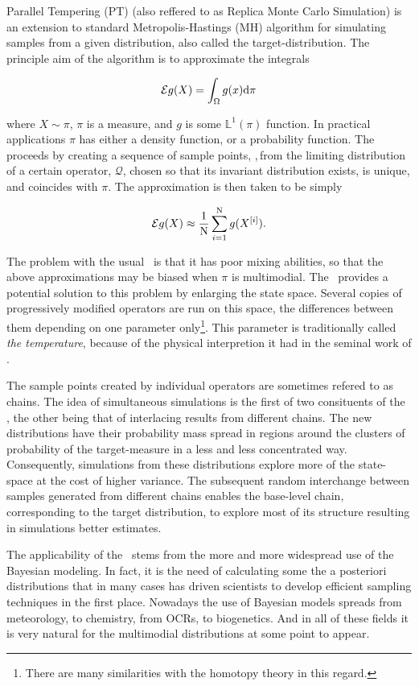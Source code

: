 
Parallel Tempering (PT) (also reffered to as Replica Monte Carlo Simulation) is an extension to standard Metropolis-Hastings (MH) algorithm for simulating samples from a given distribution, also called the target-distribution. The principle aim of the algorithm is to approximate the integrals 

\begin{equation}\label{mainGoal}
	\mathcal{E} g(X) = \int_\Omega g(x) \mathrm{d } \pi
\end{equation}

where $X\sim \pi$, $\pi$ is a measure, and $g$ is some $\mathbb{L}^1(\pi)$ function. In practical applications $\pi$ has either a density function, or a probability function. The \MH\, proceeds by creating a sequence of sample points, \sample,\,from the limiting distribution of a certain operator, $\mathcal{Q}$, chosen so that its invariant distribution exists, is unique, and coincides with $\pi$. The approximation is then taken to be simply

\begin{equation*}
	\mathcal{E} g(X) \approx \frac{1}{\mathrm{N}}\sum_{i = 1}^{\mathrm{N}} g(X^{[i]}).
\end{equation*}

The problem with the usual \MH\, is that it has poor mixing abilities, so that the above approximations may be biased when $\pi$ is multimodial. The \PT\, provides a potential solution to this problem by enlarging the state space. Several copies of progressively modified operators are run on this space, the differences between them depending on one parameter only\footnote{There are many similarities with the homotopy theory in this regard.}. This parameter is traditionally called {\it the temperature}, because of the physical interpretion it had in the seminal work of \cite{RobertSwendsen}. 

The sample points created by individual operators are sometimes refered to as chains. The idea of simultaneous simulations is the first of two consituents of the \PT, the other being that of interlacing results from different chains. The new distributions have their probability mass spread in regions around the clusters of probability of the target-measure in a less and less concentrated way. Consequently, simulations from these distributions explore more of the state-space at the cost of higher variance. The subsequent random interchange between samples generated from different chains enables the base-level chain, corresponding to the target distribution, to explore most of its structure resulting in simulations better estimates.

The applicability of the \PT\, stems from the more and more widespread use of the Bayesian modeling. In fact, it is the need of calculating some the a posteriori distributions that in many cases has driven scientists to develop efficient sampling techniques in the first place. Nowadays the use of Bayesian models spreads from meteorology, to chemistry, from OCRs, to biogenetics. And in all of these fields it is very natural for the multimodial distributions at some point to appear.